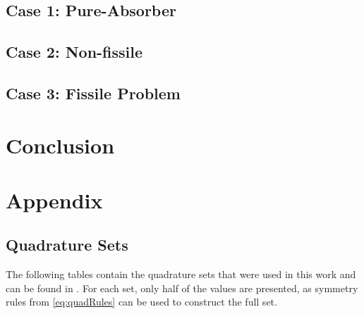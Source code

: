 \documentclass{article}
\begin{document}
\subsection{Case 1: Pure-Absorber} \label{sec:pa}

\subsection{Case 2: Non-fissile} \label{sec:nonFissile}

\subsection{Case 3: Fissile Problem} \label{sec:fissile}

\section{Conclusion} 




\section{Appendix}

\subsection{Quadrature Sets} \label{sec:qsets}
The following tables contain the quadrature sets that were used in this work and can be found
in \cite{lewis1984computational}.
For each set, only half of the values are presented, as symmetry rules from \cref{eq:quadRules}
can be used to construct the full set.



\end{document}
